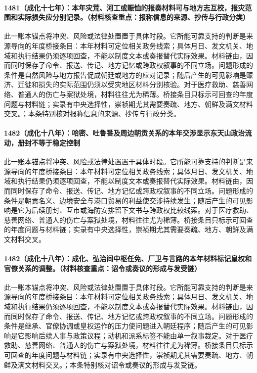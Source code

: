 \paragraph{1481（成化十七年）：本年灾荒、河工或赈恤的报奏材料可与地方志互校，报灾范围和实际损失应分别记录。（材料核查重点：报称信息的来源、抄传与行政分类）} 此一账本锚点将冲突、风险或法律处置置于具体时段。它所能可靠支持的判断是来源导向的年度桥接条目：本年材料可定位相关政务线索；具体月日、发文机关、地域和执行结果仍须逐项回查，不能以制度文本或奏报替代实际效果。材料链由，因而同时保存了命令、报送、传记、地方记忆或跨政权叙事的不同立场。问题形成的条件是自然风险与地方报告促成朝廷或地方的应对记录；随后产生的可见影响是赈济、迁徙和损失的实际范围仍须以受灾地区材料分别核验。对于医疗救助、慈善网络、普通人的伤亡与案狱处境，材料往往尤为稀薄。桥接条目只标示可回查的年度问题与材料链；实录有中央选择性，崇祯期尤其需要奏疏、地方、朝鲜及满文材料交叉。；本条特别核对报称信息的来源、抄传与行政分类。

\paragraph{1482（成化十八年）：哈密、吐鲁番及周边朝贡关系的本年交涉显示东天山政治流动，册封不等于稳定控制} 此一账本锚点将冲突、风险或法律处置置于具体时段。它所能可靠支持的判断是来源导向的年度桥接条目：本年材料可定位相关政务线索；具体月日、发文机关、地域和执行结果仍须逐项回查，不能以制度文本或奏报替代实际效果。材料链由，因而同时保存了命令、报送、传记、地方记忆或跨政权叙事的不同立场。问题形成的条件是朝贡名义、边境安全与港口贸易的利益使交涉持续发生；随后产生的可见影响是它为后续册封、互市或海防安排留下文书与跨政权比较线索。对于医疗救助、慈善网络、普通人的伤亡与案狱处境，材料往往尤为稀薄。桥接条目只标示可回查的年度问题与材料链；实录有中央选择性，崇祯期尤其需要奏疏、地方、朝鲜及满文材料交叉。

\paragraph{1482（成化十八年）：成化、弘治间中枢任免、厂卫与言路的本年材料标记皇权和官僚关系的调整。（材料核查重点：诏令或奏议的形成与发受链）} 此一账本锚点将冲突、风险或法律处置置于具体时段。它所能可靠支持的判断是来源导向的年度桥接条目：本年材料可定位相关政务线索；具体月日、发文机关、地域和执行结果仍须逐项回查，不能以制度文本或奏报替代实际效果。材料链由，因而同时保存了命令、报送、传记、地方记忆或跨政权叙事的不同立场。问题形成的条件是继承、官僚协调或皇权运作的压力使问题进入朝廷程序；随后产生的可见影响是它影响后续人事与政策议程；动机和派系标签不能由单一叙事裁定。对于医疗救助、慈善网络、普通人的伤亡与案狱处境，材料往往尤为稀薄。桥接条目只标示可回查的年度问题与材料链；实录有中央选择性，崇祯期尤其需要奏疏、地方、朝鲜及满文材料交叉。；本条特别核对诏令或奏议的形成与发受链。

